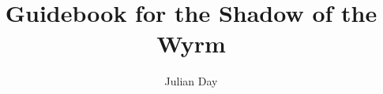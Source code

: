 \documentclass{article}
\begin{document}
\title{Guidebook for the Shadow of the Wyrm}
\author{Julian Day}
\maketitle
\thispagestyle{empty}

\newpage
\clearpage
\thispagestyle{empty}

\tableofcontents

\newpage
\setcounter{page}{1}






\end{document}
